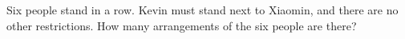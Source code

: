 Six people stand in a row. Kevin must stand next to Xiaomin, and there are no other restrictions. How many arrangements of the six people are there?
